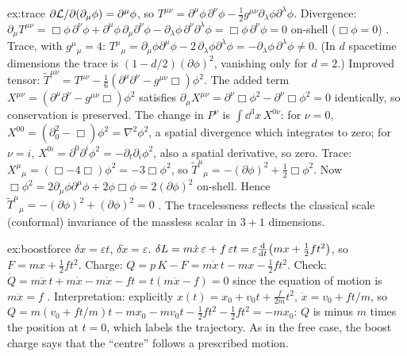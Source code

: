 \documentclass[11pt]{article}
\newcommand{\eps}{\varepsilon}
\begin{document}
\begin{solution}{ex:trace}
$\partial\mathcal{L}/\partial(\partial_\mu\phi)=\partial^\mu\phi$, so $T^{\mu\nu}=\partial^\mu\phi\,\partial^\nu\phi-\tfrac12g^{\mu\nu}\partial_\lambda\phi\partial^\lambda\phi$. Divergence: $\partial_\mu T^{\mu\nu}=\Box\phi\,\partial^\nu\phi+\partial^\mu\phi\,\partial_\mu\partial^\nu\phi-\partial_\lambda\phi\,\partial^\nu\partial^\lambda\phi=\Box\phi\,\partial^\nu\phi=0$ on-shell ($\Box\phi=0$) \checkmark. Trace, with $g^\mu{}_\mu=4$: $T^\mu{}_\mu=\partial_\mu\phi\partial^\mu\phi-2\,\partial_\lambda\phi\partial^\lambda\phi=-\partial_\lambda\phi\,\partial^\lambda\phi\ne0$. (In $d$ spacetime dimensions the trace is $(1-d/2)(\partial\phi)^2$, vanishing only for $d=2$.) Improved tensor: $\tilde T^{\mu\nu}=T^{\mu\nu}-\tfrac16(\partial^\mu\partial^\nu-g^{\mu\nu}\Box)\phi^2$. The added term $X^{\mu\nu}=(\partial^\mu\partial^\nu-g^{\mu\nu}\Box)\phi^2$ satisfies $\partial_\mu X^{\mu\nu}=\partial^\nu\Box\phi^2-\partial^\nu\Box\phi^2=0$ identically, so conservation is preserved. The change in $P^\nu$ is $\int\dd^3x\,X^{0\nu}$: for $\nu=0$, $X^{00}=(\partial_0^2-\Box)\phi^2=\nabla^2\phi^2$, a spatial divergence which integrates to zero; for $\nu=i$, $X^{0i}=\partial^0\partial^i\phi^2=-\partial_t\partial_i\phi^2$, also a spatial derivative, so zero. Trace: $X^\mu{}_\mu=(\Box-4\Box)\phi^2=-3\Box\phi^2$, so $\tilde T^\mu{}_\mu=-(\partial\phi)^2+\tfrac12\Box\phi^2$. Now $\Box\phi^2=2\partial_\mu\phi\partial^\mu\phi+2\phi\Box\phi=2(\partial\phi)^2$ on-shell. Hence $\tilde T^\mu{}_\mu=-(\partial\phi)^2+(\partial\phi)^2=0$ \checkmark. The tracelessness reflects the classical scale (conformal) invariance of the massless scalar in $3+1$ dimensions.
\end{solution}

\begin{solution}{ex:boostforce}
$\delta x=\eps t$, $\delta\dot x=\eps$. $\delta L=m\dot x\,\eps+f\,\eps t=\eps\diff{}{t}\big(mx+\tfrac12ft^2\big)$, so $F=mx+\tfrac12ft^2$. Charge: $Q=p\,K-F=m\dot x\,t-mx-\tfrac12ft^2$. Check: $\dot Q=m\ddot x\,t+m\dot x-m\dot x-ft=t(m\ddot x-f)=0$ since the equation of motion is $m\ddot x=f$ \checkmark. Interpretation: explicitly $x(t)=x_0+v_0t+\tfrac{f}{2m}t^2$, $\dot x=v_0+ft/m$, so $Q=m(v_0+ft/m)t-m x_0-mv_0t-\tfrac12ft^2-\tfrac12ft^2=-mx_0$: $Q$ is minus $m$ times the position at $t=0$, which labels the trajectory. As in the free case, the boost charge says that the ``centre'' follows a prescribed motion.
\end{solution}
\end{document}
